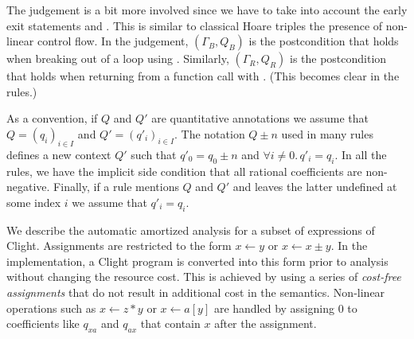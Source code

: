 \documentclass[nocopyrightspace,preprint,pldi]{sigplanconf-pldi15}
\begin{document}
The judgement is a bit more involved since we have to take into
account the early exit statements  and .
This is similar to classical Hoare triples the presence of non-linear
control flow. In the judgement, $(\Gamma_B, Q_B)$ is the postcondition
that holds when breaking out of a loop using .  %
Similarly, $(\Gamma_R, Q_R)$ is the postcondition that holds when
returning from a function call with . (This becomes clear
in the rules.)


As a convention, if $Q$ and $Q'$ are quantitative annotations
we assume that $Q = (q_i)_{i\in I}$ and $Q' = (q'_i)_{i \in I}$.
The notation $Q \pm n$ used in many rules defines a new context $Q'$
such that $q'_0 = q_0 \pm n$ and $\forall i \neq 0 .\, q'_i = q_i$.
In all the rules, we have the implicit side condition that all rational
coefficients are non-negative.  Finally, if a rule mentions $Q$ and $Q'$
and leaves the latter undefined at some index $i$ we assume that $q'_i = q_i$.

We describe the automatic amortized analysis for a subset of
expressions of Clight.  Assignments are restricted to the form $x \gets
y$ or $x \gets x \pm y$.  In the implementation, a Clight
program is converted into this form prior to analysis without changing
the resource cost.  This is achieved by using a series of \emph{cost-free
  assignments} that do not result in additional cost in the
semantics.  Non-linear operations such as $x \gets z*y$ or $x \gets
a[y]$ are handled by assigning $0$ to coefficients
like $q_{xa}$ and $q_{ax}$ that contain $x$ after the assignment.
\end{document}
